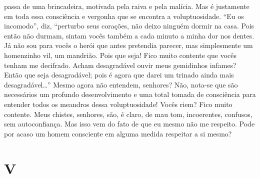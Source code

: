 passa de uma brincadeira, motivada pela raiva e pela malícia. Mas é
justamente em toda essa consciência e vergonha que se encontra a
voluptuosidade. “Eu os incomodo”, diz, “perturbo seus corações, não
deixo ninguém dormir na casa. Pois então não durmam, sintam vocês
também a cada minuto a minha dor nos dentes. Já não sou para vocês o
herói que antes pretendia parecer, mas simplesmente um homenzinho vil,
um mandrião. Pois que seja! Fico muito contente que vocês tenham me
decifrado. Acham desagradável ouvir meus gemidinhos infames? Então que
seja desagradável; pois é agora que darei um trinado ainda mais
desagradável\ldots{}” Mesmo agora não entendem, senhores? Não, nota-se que
são necessários um profundo desenvolvimento e uma total tomada de
consciência para entender todos os meandros dessa voluptuosidade! Vocês
riem? Fico muito contente. Meus chistes, senhores, são, é claro, de mau
tom, incoerentes, confusos, sem autoconfiança. Mas isso vem do fato de
que eu mesmo não me respeito. Pode por acaso um homem consciente em
alguma medida respeitar a si mesmo?


\section{V}

